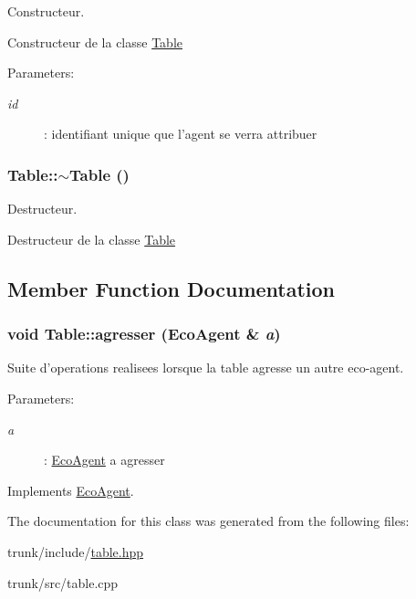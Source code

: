 Constructeur. 

Constructeur de la classe \hyperlink{classTable}{Table}

\begin{Desc}
\item[Parameters:]
\begin{description}
\item[{\em id}]: identifiant unique que l'agent se verra attribuer \end{description}
\end{Desc}
\hypertarget{classTable_9a559f2e7beb37b511ee9f88873164f8}{
\subsubsection[{$\sim$Table}]{\setlength{\rightskip}{0pt plus 5cm}Table::$\sim$Table ()}}
\label{classTable_9a559f2e7beb37b511ee9f88873164f8}


Destructeur. 

Destructeur de la classe \hyperlink{classTable}{Table} 

\subsection{Member Function Documentation}
\hypertarget{classTable_e636451a26e8fd61aa9b4c09a92262f7}{
\subsubsection[{agresser}]{\setlength{\rightskip}{0pt plus 5cm}void Table::agresser ({\bf EcoAgent} \& {\em a})}}
\label{classTable_e636451a26e8fd61aa9b4c09a92262f7}


Suite d'operations realisees lorsque la table agresse un autre eco-agent. 

\begin{Desc}
\item[Parameters:]
\begin{description}
\item[{\em a}]: \hyperlink{classEcoAgent}{EcoAgent} a agresser \end{description}
\end{Desc}


Implements \hyperlink{classEcoAgent_867f0c274eb3ed0b61cb1fe7baa67edd}{EcoAgent}.

The documentation for this class was generated from the following files:\begin{CompactItemize}
\item 
trunk/include/\hyperlink{table_8hpp}{table.hpp}\item 
trunk/src/table.cpp\end{CompactItemize}
